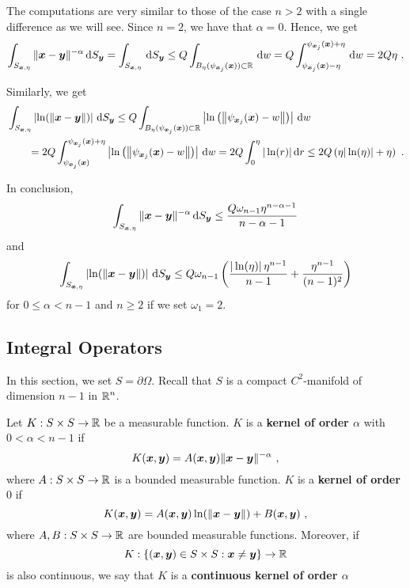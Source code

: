 The computations are very similar to those of the case $n>2$ with a
single difference as we will see.  Since $n = 2$, we have that
$\alpha = 0$.  Hence, we get
\[
\int_{S_{{\bm{x}},\eta}} \|{\bm{x}}-{\bm{y}}\|^{-\alpha} \,\mathrm{d}{S}_{{\bm{y}}}
= \int_{S_{{\bm{x}},\eta}} \,\mathrm{d}{S}_{{\bm{y}}}
\leq Q \int_{B_{\eta}(\psi_{{\bm{x}}_j}({\bm{x}})) \subset \mathbb{R}} \,\mathrm{d}{w}
= Q \int_{\psi_{{\bm{x}}_j}({\bm{x}})-\eta}^{\psi_{{\bm{x}}_j}({\bm{x}})+\eta}
  \,\mathrm{d}{w} = 2 Q \eta  \ .
\]

Similarly, we get
\begin{align*}
&\int_{S_{{\bm{x}},\eta}} \left|\ln(\|{\bm{x}}-{\bm{y}}\|)\right| \,\mathrm{d}{S}_{{\bm{y}}}
\leq Q \int_{B_{\eta}(\psi_{{\bm{x}}_j}({\bm{x}}))\subset \mathbb{R}}
\left|\ln\left( \left\|\psi_{{\bm{x}}_j}({\bm{x}})-w\right\|\right)\right|
\,\mathrm{d}{w} \\
&\qquad = 2Q \int_{\psi_{{\bm{x}}_j}({\bm{x}})}^{\psi_{{\bm{x}}_j}({\bm{x}})+\eta}
\left| \ln\left( \left\|\psi_{{\bm{x}}_j}({\bm{x}})-w\right\|\right) \right|
\,\mathrm{d}{w}
= 2Q \int_0^{\eta} |\ln(r)| \,\mathrm{d}{r}
\leq 2 Q \left( \eta |\ln(\eta)| + \eta \right) \ .
\end{align*}

In conclusion,
\begin{equation} \label{Sxepsint1}
\int_{S_{{\bm{x}},\eta}} \|{\bm{x}}-{\bm{y}}\|^{-\alpha} \,\mathrm{d}{S}_{{\bm{y}}}
\leq \frac{ Q \omega_{n-1} \eta^{n-\alpha-1}}{n-\alpha -1}
\end{equation}
and
\begin{equation} \label{Sxepsint2}
\int_{S_{{\bm{x}},\eta}} \left|\ln(\|{\bm{x}}-{\bm{y}}\|)\right| \,\mathrm{d}{S}_{{\bm{y}}}
\leq Q \omega_{n-1} \left( \frac{|\ln(\eta)|\, \eta^{n-1}}{n-1}  +
  \frac{\eta^{n-1}}{(n-1)^2} \right)
\end{equation}
for $0 \leq \alpha < n-1$ and $n\geq 2$ if we set
$\omega_1 = 2$.

\subsection{Integral Operators}

In this section, we set $S = \partial \Omega$.  Recall that $S$ is a compact
$\displaystyle C^2$-manifold of dimension $n-1$ in $\displaystyle \mathbb{R}^n$.

\begin{defn} \label{pot_kerOk}
Let $K:S \times S \rightarrow \mathbb{R}$ be a measurable function.  $K$ is a
{\bfseries kernel of order $\alpha$}
with $0< \alpha < n-1$ if
\[
K({\bm{x}},{\bm{y}}) = A({\bm{x}}, {\bm{y}}) \|{\bm{x}}-{\bm{y}}\|^{-\alpha} \ ,
\]
where $A:S\times S \rightarrow \mathbb{R}$ is a bounded measurable function.
$K$ is a
{\bfseries kernel of order $0$} if
\[
K({\bm{x}},{\bm{y}}) = A({\bm{x}}, {\bm{y}}) \ln(\|{\bm{x}}-{\bm{y}}\|)
+B({\bm{x}},{\bm{y}}) \ ,
\]
where $A, B:S\times S \rightarrow \mathbb{R}$ are bounded measurable
functions.  Moreover, if
\[
K: \{ ({\bm{x}},{\bm{y}}) \in S \times S : {\bm{x}} \neq {\bm{y}} \}
\rightarrow \mathbb{R}
\]
is also continuous, we say that $K$ is a
{\bfseries continuous kernel of order $\alpha$}
\end{defn}

